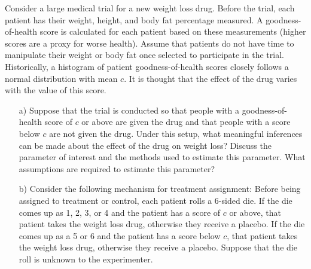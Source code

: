 \documentclass{article}
\begin{document}
\noindent Consider a large medical trial for a new weight loss drug.  
      Before the trial, 
      each patient has their weight, height, and body fat percentage measured.
      A goodness-of-health score 
      is calculated for each patient based on these measurements
      (higher scores are a proxy for worse health).
      Assume that patients do not have time to manipulate their weight or body fat
      once selected to participate in the trial.
      Historically, a histogram of patient goodness-of-health 
      scores closely follows a normal
      distribution with mean $c$.
      It is thought that the effect of the drug varies with the value of this score.
      \begin{itemize}
        \item[a)]  
          Suppose that the trial is conducted so that people with a 
          goodness-of-health score of $c$ or above 
          are given the drug and that people with a score below $c$ are not given the drug.
          Under this setup,
          what meaningful inferences can be made about the effect of the drug on weight loss? 
          Discuss the parameter of interest and the 
          methods used to estimate this parameter.
          What assumptions are required to estimate this parameter?
        \item[b)]
          Consider the following mechanism for treatment assignment:
          Before being assigned to treatment or control, each patient rolls a 6-sided die.
          If the die comes up as 1, 2, 3, or 4 and the patient has a score of $c$ or above,
          that patient takes the weight loss drug, otherwise they receive a placebo.
          If the die comes up as a 5 or 6 and the patient has a score below $c$,
          that patient takes the weight loss drug, otherwise they receive a placebo.
          Suppose that the die roll is unknown to the experimenter.
          

\end{itemize}
\end{document}
